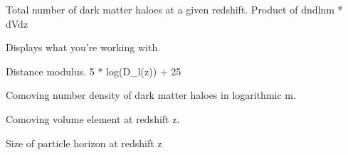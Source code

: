 \documentclass[letterpaper,10pt,english]{sphinxmanual}
\begin{document}
\begin{fulllineitems}

\begin{fulllineitems}
\label{PyCosmo:PyCosmo.cosmology.Cosmology.dNdlnmdz}
Total number of dark matter haloes at a given redshift.
Product of dndlnm * dVdz

\end{fulllineitems}


\begin{fulllineitems}
\label{PyCosmo:PyCosmo.cosmology.Cosmology.display}
Displays what you're working with.

\end{fulllineitems}


\begin{fulllineitems}
\label{PyCosmo:PyCosmo.cosmology.Cosmology.dist_mod}
Distance modulus.
5 * log(D\_l(z)) + 25

\end{fulllineitems}


\begin{fulllineitems}
\label{PyCosmo:PyCosmo.cosmology.Cosmology.dndlnm}
Comoving number density of dark matter haloes in logarithmic m.

\end{fulllineitems}


\begin{fulllineitems}
\label{PyCosmo:PyCosmo.cosmology.Cosmology.dvdz}
Comoving volume element at redshift z.

\end{fulllineitems}


\begin{fulllineitems}
\label{PyCosmo:PyCosmo.cosmology.Cosmology.eta}
Size of particle horizon at redshift z


\end{fulllineitems}
\end{fulllineitems}
\end{document}
